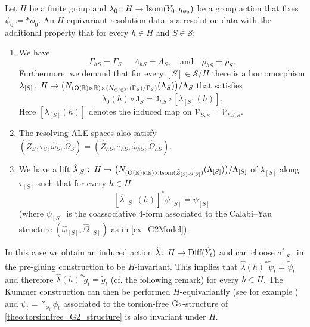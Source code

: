 \documentclass[11pt,a4paper]{scrartcl}
\newcommand{\col}{\colon \thinspace}
\newcommand{\G}{\textup{G}}
\renewcommand{\O}{\textup{O}}
\numberwithin{equation}{section}
\theoremstyle{plain}
\theoremstyle{definition}
\theoremstyle{remark}
\begin{document}
\begin{remark}\label{rem:EquivariantGeneralisedKummer}
Let $H$ be a finite group and $\lambda_0 \col H \to \textup{Isom}(Y_0,g_{\phi_0})$ be a group action that fixes $\psi_0 \coloneqq * \phi_0$. An $H$-equivariant resolution data is a resolution data with the additional property that for every $h\in H$ and $S\in \mathcal{S}$: \begin{enumerate}
\item We have \[ \Gamma_{hS} = \Gamma_S, \quad \Lambda_{hS}=\Lambda_S, \quad \text{and} \quad \rho_{hS}=\rho_S.\] Furthermore, we demand that for every $[S]\in \mathcal{S}/H$ there is a homomorphism $ \lambda_{[S]} \col H \to \big(N_{(\O(\mathbb{R})\ltimes \mathbb{R})\times (N_{\O(\mathbb{C}^3)}(\Gamma_S)/\Gamma_S)}(\Lambda_S)\big)/\Lambda_S$ that satisfies \[\lambda_0(h)\circ \mathtt{J}_S = \mathtt{J}_{hS} \circ [\lambda_{[S]}(h) ].\] Here $[\lambda_{[S]}(h)]$ denotes the induced map on $\mathcal{V}_{S,\kappa} = \mathcal{V}_{hS,\kappa}$.
\item The resolving ALE spaces also satisfy $(\hat{Z}_S,\tau_S,\hat{\omega}_S,\hat{\Omega}_S)=(\hat{Z}_{hS},\tau_{hS},\hat{\omega}_{hS},\hat{\Omega}_{hS})$.
\item We have a lift $\hat{\lambda}_{[S]} \col H \to \big(N_{(\O(\mathbb{R})\ltimes \mathbb{R) \times}\textup{Isom}(\hat{Z}_{[S]},\hat{g}_{[S]})}(\Lambda_{[S]})\big)/\Lambda_{[S]}$ of $\lambda_{[S]}$ along $\tau_{[S]}$ such that for every $h \in H$ \[[\hat{\lambda}_{[S]}(h)]^*\psi_{[S]} = \psi_{[S]}\] (where $\psi_{[S]}$ is the coassociative 4-form associated to the Calabi--Yau structure $(\hat{\omega}_{[S]},\hat{\Omega}_{[S]})$ as in \autoref{ex_G2Model}).
\end{enumerate}
In this case we obtain an induced action $\hat{\lambda} \col H \to \textup{Diff}(\hat{Y}_t)$ and can choose $\sigma_{[S]}^t$ in the pre-gluing construction to be $H$-invariant. This implies that $\hat{\lambda}(h)^*\tilde{\psi}_t = \tilde{\psi}_t$ and therefore $\hat{\lambda}(h)^*\tilde{g}_t = \tilde{g}_t$ (cf. the following remark) for every $h\in H$. The Kummer construction can then be performed $H$-equivariantly (see for example \cite[Section~4.2]{Joyce-GeneralisedKummer2}) and $\psi_t =*_{\phi_t} \phi_t$ associated to the torsion-free $\G_2$-structure of \autoref{theo:torsionfree_G2_structure} is also invariant under $H$.
\end{remark}
\end{document}
